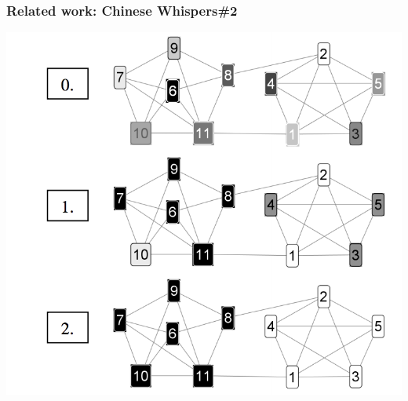 \begin{frame}[fragile]
\frametitle{Related work: Chinese Whispers\#2}
\begin{center}
 \includegraphics[height=0.59\textwidth]{figures/cw2}
 
 \end{center}
\end{frame}


%
%	
%	
%
%
%
%
%
%
%

